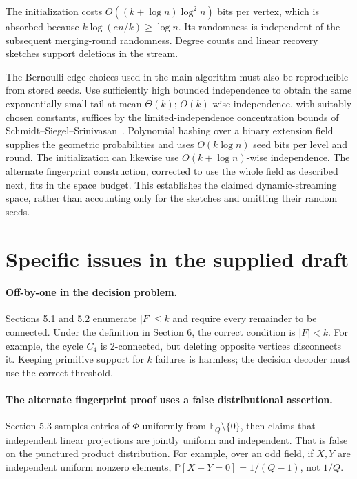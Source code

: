 \documentclass[11pt]{article}
\theoremstyle{remark}\newtheorem{remark}[theorem]{Remark}
\newcommand{\F}{\mathbb F}
\newcommand{\Prb}{\mathbb P}
\begin{document}
The initialization costs $O((k+\log n)\log^2n)$ bits per vertex, which is absorbed because $k\log(en/k)\ge\log n$. Its randomness is independent of the subsequent merging-round randomness. Degree counts and linear recovery sketches support deletions in the stream.

The Bernoulli edge choices used in the main algorithm must also be reproducible from stored seeds. Use sufficiently high bounded independence to obtain the same exponentially small tail at mean $\Theta(k)$; $O(k)$-wise independence, with suitably chosen constants, suffices by the limited-independence concentration bounds of Schmidt--Siegel--Srinivasan~\cite{SSS95}. Polynomial hashing over a binary extension field supplies the geometric probabilities and uses $O(k\log n)$ seed bits per level and round. The initialization can likewise use $O(k+\log n)$-wise independence. The alternate fingerprint construction, corrected to use the whole field as described next, fits in the space budget. This establishes the claimed dynamic-streaming space, rather than accounting only for the sketches and omitting their random seeds.

\section{Specific issues in the supplied draft}
\paragraph{Off-by-one in the decision problem.}
Sections 5.1 and 5.2 enumerate $|F|\le k$ and require every remainder to be connected. Under the definition in Section 6, the correct condition is $|F|<k$. For example, the cycle $C_4$ is 2-connected, but deleting opposite vertices disconnects it. Keeping primitive support for $k$ failures is harmless; the decision decoder must use the correct threshold.

\paragraph{The alternate fingerprint proof uses a false distributional assertion.}
Section 5.3 samples entries of $\Phi$ uniformly from $\F_Q\setminus\{0\}$, then claims that independent linear projections are jointly uniform and independent. That is false on the punctured product distribution. For example, over an odd field, if $X,Y$ are independent uniform nonzero elements, $\Prb[X+Y=0]=1/(Q-1)$, not $1/Q$.
\end{document}

